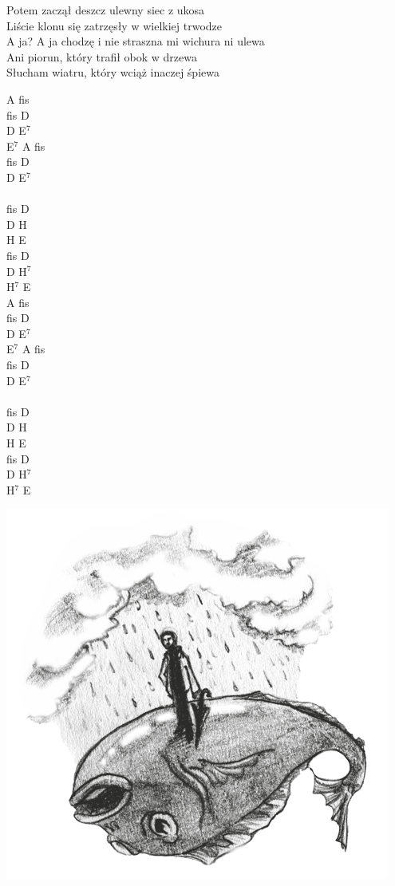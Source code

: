 \documentclass[a5paper, 10pt]{book}
\begin{document}
\begin{minipage}[t]{0.8\textwidth}
  \hspace*{3mm}Potem zaczął deszcz ulewny siec z ukosa\\
  \hspace*{3mm}Liście klonu się zatrzęsły w wielkiej trwodze\\
  \hspace*{3mm}A ja? A ja chodzę i nie straszna mi wichura ni ulewa\\
  \hspace*{3mm}Ani piorun, który trafił obok w drzewa\\
  \hspace*{3mm}Słucham wiatru, który wciąż inaczej śpiewa\\
\end{minipage}
\begin{minipage}[t]{0.2\textwidth}
  A fis\\
  fis D\\
  D E$^7$\\
  E$^7$ A fis\\
  fis D\\
  D E$^7$\\
  \\
  fis D\\
  D H\\
  H E\\
  fis D\\
  D H$^7$\\
  H$^7$ E\\

  A fis\\
  fis D\\
  D E$^7$\\
  E$^7$ A fis\\
  fis D\\
  D E$^7$\\
  \\
  fis D\\
  D H\\
  H E\\
  fis D\\
  D H$^7$\\
  H$^7$ E\\
\end{minipage}
\includegraphics[height=0.4\textwidth,center]{images/ciagle_pada.png}\\
\end{document}
